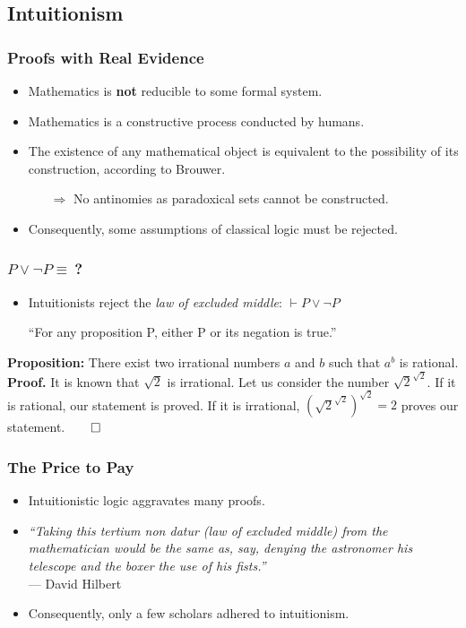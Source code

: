 \documentclass{beamer}
\begin{document}
\subsection{Intuitionism}
\begin{frame}
    \frametitle{Proofs with Real Evidence}
    \begin{itemize}[<+->]
	\item Mathematics is \textbf{not} reducible to some formal system.
	\item Mathematics is a constructive process conducted by humans.
	\item The existence of any mathematical object is equivalent to the possibility of its construction, according to Brouwer.
	\begin{itemize}
		\item[$\Rightarrow$] No antinomies as paradoxical sets cannot be constructed.
	\end{itemize}
	\item Consequently, some assumptions of classical logic must be rejected.
    \end{itemize}
\end{frame}
\begin{frame}
    \frametitle{$P\lor\lnot P\equiv\ $?}
    \begin{itemize}[<+->]
	\item Intuitionists reject the \textit{law of excluded middle}: $\vdash P\lor\lnot P$\\
		\begin{centering}
			``For any proposition P, either P or its negation is true.''
		\end{centering}
    \end{itemize}
	\pause[\thebeamerpauses]
	\textbf{Proposition:} There exist two irrational numbers $a$ and $b$ such that $a^b$ is rational.\\\pause
	\vspace{\baselineskip}
	\textbf{Proof.} It is known that $\sqrt{2}$ is irrational. Let us consider the number $\sqrt{2}^{\sqrt{2}}$.\pause$ $ If it is rational, our statement is proved.\pause$ $ If it is irrational, $(\sqrt{2}^{\sqrt{2}})^{\sqrt{2}}=2$ proves our statement.\hfill$\qed$
\end{frame}
\begin{frame}
    \frametitle{The Price to Pay}
    \begin{itemize}[<+->]
	\item Intuitionistic logic aggravates many proofs.
	\item \textit{``Taking this tertium non datur (law of excluded middle) from the mathematician would be the same as, say, denying the astronomer his telescope and the boxer the use of his fists.''}\nocite{hilbert_tertium_non_datur}\\\hfill--- David Hilbert
	\item Consequently, only a few scholars adhered to intuitionism.
    \end{itemize}
\end{frame}
\end{document}
